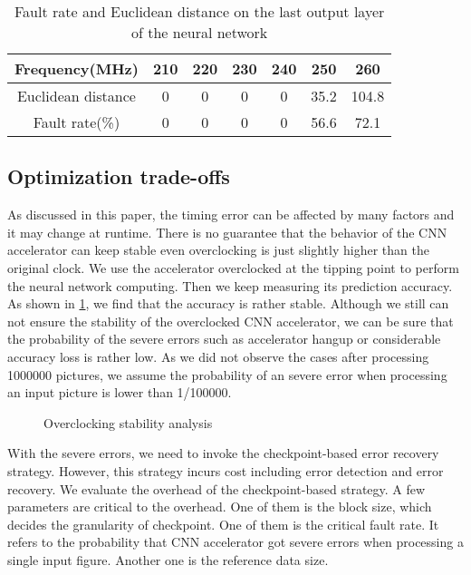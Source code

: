 \begin{table}
        \centering
        \vspace{-0.3em}
        \caption{Fault rate and Euclidean distance on the last output layer of the neural network}
        \label{tab:fr_ed}
        \vspace{-0.3em}
        \begin{tabular}{c|cccccc}
                \toprule
                Frequency(MHz) & 210 & 220 & 230 & 240 & 250 & 260 \\
                \midrule
                Euclidean distance & 0 & 0 & 0 & 0 & 35.2 & 104.8 \\
		\midrule
                Fault rate(\%) & 0 & 0 & 0 & 0 & 56.6 & 72.1 \\
                \bottomrule
        \end{tabular}
        \vspace{-1em}
\end{table}

\subsection{Optimization trade-offs}
As discussed in this paper, the timing error can be affected by many factors and it may change 
at runtime. There is no guarantee that the behavior of the CNN accelerator can keep stable even 
overclocking is just slightly higher than the original clock. We use the accelerator overclocked at the 
tipping point to perform the neural network computing. Then we keep measuring its 
prediction accuracy. As shown in \ref{fig:stability}, we find that the accuracy is rather stable.
Although we still can not ensure the stability of the overclocked CNN accelerator, we can 
be sure that the probability of the severe errors such as accelerator hangup or considerable 
accuracy loss is rather low. As we did not observe the cases after processing 1000000 pictures, 
we assume the probability of an severe error when processing an input picture is lower than 1/100000.

\begin{figure}
    \caption{Overclocking stability analysis}
\label{fig:stability}
\vspace{-1em}
\end{figure}


With the severe errors, we need to invoke the checkpoint-based error recovery strategy. 
However, this strategy incurs cost including error detection and error recovery. 
We evaluate the overhead of the checkpoint-based strategy. 
A few parameters are critical to the overhead. One of them is the block size, which 
decides the granularity of checkpoint. One of them is the critical 
fault rate. It refers to the probability that CNN accelerator got severe errors 
when processing a single input figure. Another one is the reference data size.

